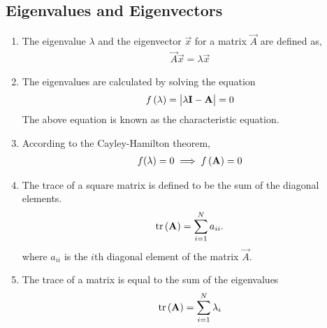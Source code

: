 \documentclass[journal,12pt,onecolumn]{IEEEtran}
\renewcommand\thesection{\arabic{section}}
\renewcommand\thesubsection{\thesection.\arabic{subsection}}
\begin{document}
\subsection{Eigenvalues and Eigenvectors}
\renewcommand{\theequation}{\theenumi}
\begin{enumerate}[label=\thesubsection.\arabic*.,ref=\thesubsection.\theenumi]
\item The eigenvalue $\lambda$ and the eigenvector $\vec{x}$  for a matrix $\vec{A}$ are defined as, 
\begin{align}
  \vec{A} \vec{x} = \lambda \vec{x}
\end{align}
\item The eigenvalues are calculated by solving the
equation
\begin{align}
  \label{eq:chareq}
f\left(\lambda\right) = \begin{vmatrix}\lambda \mathbf{I}- \mathbf{A} \end{vmatrix} =0
\end{align}
The above equation is known as the characteristic equation.
\item According to the Cayley-Hamilton theorem,
\begin{align}
	\label{eq:cayley}
  f(\lambda) = 0 \implies f\left(\mathbf{A}\right) = 0
\end{align}
\item The trace of a square  matrix is defined to be the sum of the diagonal elements.
\begin{align}
	\label{eq:trace}
	\text{tr}\left(\mathbf{A}\right)=\sum_{i=1}^{N}a_{ii}.
\end{align}
	where $a_{ii}$ is the $i$th diagonal element of the matrix $\vec{A}$. 	
\item The trace of a matrix is equal to the sum of the eigenvalues
\begin{align}
	\label{eq:trace_eig}
	\text{tr}\left(\mathbf{A}\right)=\sum_{i=1}^{N}\lambda_i
\end{align}


\end{enumerate}
\end{document}
